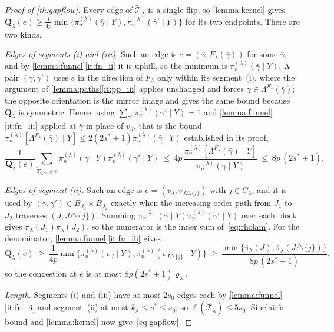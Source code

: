 \begin{proof}[Proof of \cref{th:gapflow}]
    Every edge of $\widetilde{\mathcal{T}}_\lambda$ is a single flip, so
    \cref{lemma:kernel} gives
    $\mathbf{Q}_\lambda(e)\geq\tfrac{1}{4p}\min\{\pi_n^{(\lambda)}
    (\bar\gamma\mid Y),\pi_n^{(\lambda)}(\bar\gamma'\mid Y)\}$ for its two
    endpoints. There are two kinds.

    \emph{Edges of segments (i) and (iii).} Such an edge is
    $e=(\bar\gamma,F_\lambda(\bar\gamma))$ for some $\bar\gamma$, and by
    \cref{lemma:funnel}\ref{it:fn_ii} it is uphill, so the minimum is
    $\pi_n^{(\lambda)}(\bar\gamma\mid Y)$. A pair
    $(\gamma,\gamma')$ uses $e$ in the direction of $F_\lambda$ only
    within its segment~(i), where the argument of
    \cref{lemma:paths}\ref{it:pp_iii} applies unchanged and forces
    $\gamma\in\Lambda^{F_\lambda}(\bar\gamma)$; the opposite orientation
    is the mirror image and gives the same bound because
    $\mathbf{Q}_\lambda$ is symmetric. Hence, using
    $\sum_{\gamma'}\pi_n^{(\lambda)}(\gamma'\mid Y)=1$ and
    \cref{lemma:funnel}\ref{it:fn_iii} applied at $\bar\gamma$ in place of
    $v_J$, that is the bound
    $\pi_n^{(\lambda)}[\Lambda^{F_\lambda}(\bar\gamma)\mid Y]\leq
    2(2s^{\ast}+1)\pi_n^{(\lambda)}(\bar\gamma\mid Y)$ established in its
    proof,
    \begin{equation*}
        \frac{1}{\mathbf{Q}_\lambda(e)}
        \sum_{\widetilde T_{\gamma,\gamma'}\ni e}
        \pi_n^{(\lambda)}(\gamma\mid Y)\pi_n^{(\lambda)}(\gamma'\mid Y)
        \ \leq\ 4p\,\frac{\pi_n^{(\lambda)}
            [\Lambda^{F_\lambda}(\bar\gamma)\mid Y]}
        {\pi_n^{(\lambda)}(\bar\gamma\mid Y)}
        \ \leq\ 8p\,(2s^{\ast}+1) .
    \end{equation*}

    \emph{Edges of segment (ii).} Such an edge is
    $e=(v_J,v_{J\triangle\{j\}})$ with $j\in C_\lambda$, and it is used by
    $(\gamma,\gamma')\in B_{J_1}\times B_{J_2}$ exactly when the
    increasing-order path from $J_1$ to $J_2$ traverses
    $(J,J\triangle\{j\})$. Summing $\pi_n^{(\lambda)}(\gamma\mid Y)
    \pi_n^{(\lambda)}(\gamma'\mid Y)$ over each block gives
    $\bar\pi_\lambda(J_1)\bar\pi_\lambda(J_2)$, so the numerator is the
    inner sum of~\eqref{eq:rholam}. For the denominator,
    \cref{lemma:funnel}\ref{it:fn_iii} gives
    \begin{equation*}
        \mathbf{Q}_\lambda(e)\ \geq\ \frac{1}{4p}
        \min\bigl\{\pi_n^{(\lambda)}(v_J\mid Y),
        \pi_n^{(\lambda)}(v_{J\triangle\{j\}}\mid Y)\bigr\}
        \ \geq\ \frac{\min\{\bar\pi_\lambda(J),
            \bar\pi_\lambda(J\triangle\{j\})\}}{8p\,(2s^{\ast}+1)} ,
    \end{equation*}
    so the congestion at $e$ is at most
    $8p(2s^{\ast}+1)\varrho_\lambda$.

    \emph{Length.} Segments (i) and (iii) have at most $2s_0$ edges each
    by \cref{lemma:funnel}\ref{it:fn_ii} and segment~(ii) at most
    $k_\lambda\leq s^{\ast}\leq s_0$, so
    $\ell(\widetilde{\mathcal{T}}_\lambda)\leq5s_0$. Sinclair's bound and
    \cref{lemma:kernel} now give~\eqref{eq:gapflow}.
\end{proof}

